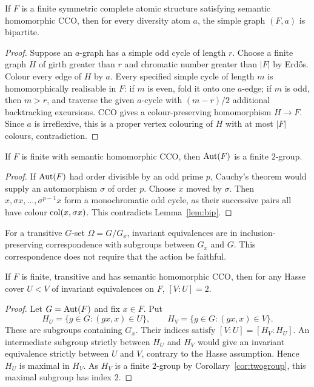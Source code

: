 \begin{lemma}\label{lem:bip}
If $F$ is a finite symmetric complete atomic structure satisfying
semantic homomorphic CCO, then for every diversity atom $a$, the
simple graph $(F,a)$ is bipartite.
\end{lemma}
\begin{proof}
Suppose an $a$-graph has a simple odd cycle of length $r$. Choose a
finite graph $H$ of girth greater than $r$ and chromatic number greater
than $|F|$ by Erd\H{o}s. Colour every edge of $H$ by $a$. Every
specified simple cycle of length $m$ is homomorphically realisable in
$F$: if $m$ is even, fold it onto one $a$-edge; if $m$ is odd, then
$m>r$, and traverse the given $a$-cycle with $(m-r)/2$ additional
backtracking excursions. CCO gives a colour-preserving homomorphism
$H\to F$. Since $a$ is irreflexive, this is a proper vertex colouring
of $H$ with at most $|F|$ colours, contradiction.
\end{proof}

\begin{corollary}\label{cor:twogroup}
If $F$ is finite with semantic homomorphic CCO, then $\operatorname{Aut}(F)$ is a
finite $2$-group.
\end{corollary}
\begin{proof}
If $\operatorname{Aut}(F)$ had order divisible by an odd prime $p$, Cauchy's theorem
would supply an automorphism $\sigma$ of order $p$. Choose $x$ moved by
$\sigma$. Then $x,\sigma x,\ldots,\sigma^{p-1}x$ form a monochromatic
odd cycle, as their successive pairs all have colour
$\operatorname{col}(x,\sigma x)$. This contradicts Lemma~\ref{lem:bip}.
\end{proof}

For a transitive $G$-set $\Omega=G/G_x$, invariant equivalences are in
inclusion-preserving correspondence with subgroups between $G_x$ and $G$.
This correspondence does not require that the action be faithful.

\begin{corollary}\label{cor:hasse}
If $F$ is finite, transitive and has semantic homomorphic CCO, then
for any Hasse cover $U<V$ of invariant equivalences on $F$,
$[V:U]=2$.
\end{corollary}
\begin{proof}
Let $G=\operatorname{Aut}(F)$ and fix $x\in F$. Put
\[
 H_U=\{g\in G:(gx,x)\in U\},\qquad
 H_V=\{g\in G:(gx,x)\in V\}.
\]
These are subgroups containing $G_x$. Their indices satisfy
$[V:U]=[H_V:H_U]$. An intermediate subgroup strictly between $H_U$
and $H_V$ would give an invariant equivalence strictly between $U$
and $V$, contrary to the Hasse assumption. Hence $H_U$ is maximal in
$H_V$. As $H_V$ is a finite $2$-group by
Corollary~\ref{cor:twogroup}, this maximal subgroup has index $2$.
\end{proof}

